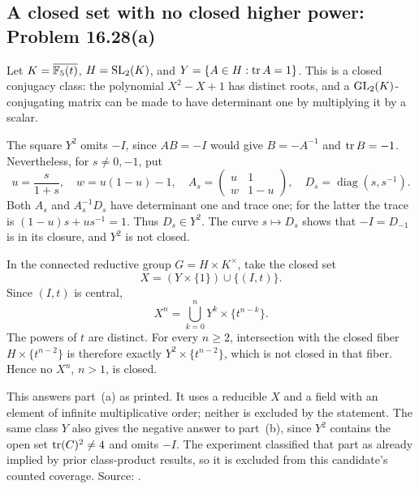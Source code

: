 \subsection{A closed set with no closed higher power: Problem 16.28(a)}
\label{cand:16.28}

Let \(K=\overline{\mathbb F_5(t)}\), \(H=\operatorname{SL}_2(K)\), and
\(Y=\{A\in H:\operatorname{tr} A=1\}\). This is a closed conjugacy class:
the polynomial \(X^2-X+1\) has distinct roots, and a
\(\operatorname{GL}_2(K)\)-conjugating matrix can be made to have determinant
one by multiplying it by a scalar.

The square \(Y^2\) omits \(-I\), since \(AB=-I\) would
give \(B=-A^{-1}\) and \(\operatorname{tr} B=-1\). Nevertheless, for
\(s\ne0,-1\), put
\[
 u=\frac{s}{1+s},\quad w=u(1-u)-1,\quad
 A_s=\begin{pmatrix}u&1\\w&1-u\end{pmatrix},\quad
 D_s=\operatorname{diag}(s,s^{-1}).
\]
Both \(A_s\) and \(A_s^{-1}D_s\) have determinant one and
trace one; for the latter the trace is
\((1-u)s+us^{-1}=1\). Thus \(D_s\in Y^2\).
The curve \(s\mapsto D_s\) shows that \(-I=D_{-1}\)
is in its closure, and \(Y^2\) is not closed.

In the connected reductive group \(G=H\times K^\times\),
take the closed set
\[
 X=(Y\times\{1\})\cup\{(I,t)\}.
\]
Since \((I,t)\) is central,
\[
 X^n=\bigcup_{k=0}^n Y^k\times\{t^{n-k}\}.
\]
The powers of \(t\) are distinct. For every \(n\geq2\),
intersection with the closed fiber
\(H\times\{t^{n-2}\}\) is therefore exactly
\(Y^2\times\{t^{n-2}\}\), which is not closed in that fiber.
Hence no \(X^n\), \(n>1\), is closed.

This answers part~(a) as printed. It uses a reducible \(X\)
and a field with an element of infinite multiplicative order;
neither is excluded by the statement. The same class \(Y\)
also gives the negative answer to part~(b), since \(Y^2\)
contains the open set \(\operatorname{tr}(C)^2\ne4\) and omits \(-I\).
The experiment classified that part as already implied by
prior class-product results, so it is excluded from this
candidate's counted coverage. Source:
.

